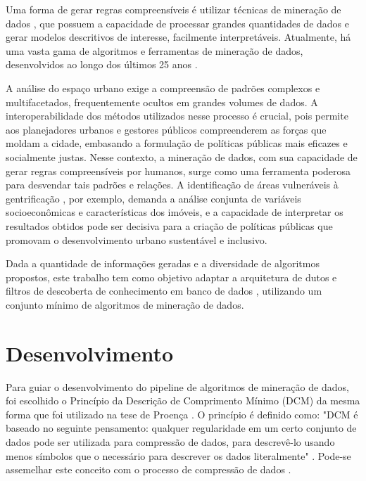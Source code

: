 \documentclass[12pt]{article}
\begin{document}
Uma forma de gerar regras compreensíveis é utilizar técnicas de mineração de dados \cite{zaki2014data}, que possuem a capacidade de processar grandes quantidades de dados e gerar modelos descritivos de interesse, facilmente interpretáveis. Atualmente, há uma vasta gama de algoritmos e ferramentas \cite{mikut2011data} de mineração de dados, desenvolvidos ao longo dos últimos 25 anos \cite{luna2019frequent}. %

A análise do espaço urbano exige a compreensão de padrões complexos e multifacetados, frequentemente ocultos em grandes volumes de dados. A interoperabilidade dos métodos utilizados nesse processo é crucial, pois permite aos planejadores urbanos e gestores públicos compreenderem as forças que moldam a cidade, embasando a formulação de políticas públicas mais eficazes e socialmente justas. Nesse contexto, a mineração de dados, com sua capacidade de gerar regras compreensíveis por humanos, surge como uma ferramenta poderosa para desvendar tais padrões e relações. A identificação de áreas vulneráveis à gentrificação \cite{andrade2020urban}, por exemplo, demanda a análise conjunta de variáveis socioeconômicas e características dos imóveis, e a capacidade de interpretar os resultados obtidos pode ser decisiva para a criação de políticas públicas que promovam o desenvolvimento urbano sustentável e inclusivo.

Dada a quantidade de informações geradas e a diversidade de algoritmos propostos, este trabalho tem como objetivo adaptar a arquitetura de dutos e filtros de descoberta de conhecimento em banco de dados \cite{nwagu2017knowledge}, utilizando um conjunto mínimo de algoritmos de mineração de dados.

\section{Desenvolvimento}

Para guiar o desenvolvimento do pipeline de algoritmos de mineração de dados, foi escolhido o Princípio da Descrição de Comprimento Mínimo (DCM) da mesma forma que foi utilizado na tese de Proença \cite{proencca2021robust}.  O princípio é definido como: "DCM é baseado no seguinte pensamento: qualquer regularidade em um certo conjunto de dados pode ser utilizada para compressão de dados, para descrevê-lo usando menos símbolos que o necessário para descrever os dados literalmente" \cite{grunwald2007minimum}. Pode-se assemelhar este conceito com o processo de compressão de dados  \cite{proencca2021robust}.
\end{document}
